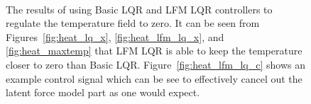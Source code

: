 \documentclass[journal]{IEEEtran}
\begin{document}
\begin{figure}[!t]
\centering
  \\
\caption{The results of using Basic LQR and LFM LQR controllers to regulate the temperature field to zero. It can be seen from Figures~\ref{fig:heat_lq_x},  \ref{fig:heat_lfm_lq_x}, and \ref{fig:heat_maxtemp} that LFM LQR is able to keep the temperature closer to zero than Basic LQR. Figure~\ref{fig:heat_lfm_lq_c} shows an example control signal which can be see to effectively cancel out the latent force model part as one would expect.}
\end{figure}
\end{document}
